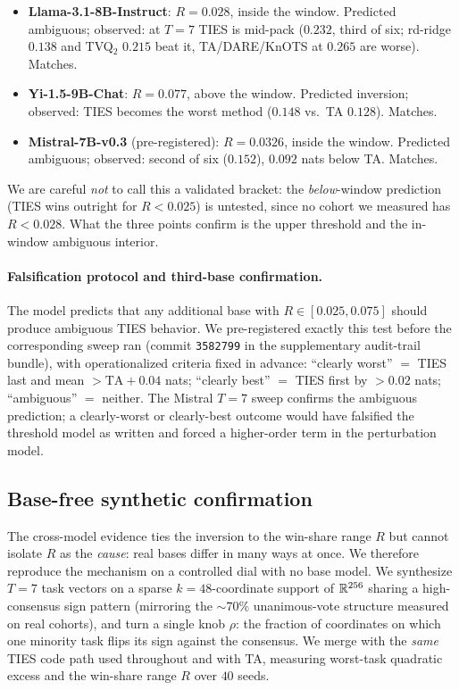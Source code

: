 \begin{itemize}[leftmargin=*,topsep=2pt,itemsep=2pt]
\item \textbf{Llama-3.1-8B-Instruct}: $R = 0.028$, inside the window.
Predicted ambiguous; observed: at $T = 7$ TIES is mid-pack ($0.232$,
third of six; rd-ridge $0.138$ and TVQ$_2$ $0.215$ beat it,
TA/DARE/KnOTS at $0.265$ are worse). Matches.
\item \textbf{Yi-1.5-9B-Chat}: $R = 0.077$, above the window.
Predicted inversion; observed: TIES becomes the worst method
($0.148$ vs.\ TA $0.128$). Matches.
\item \textbf{Mistral-7B-v0.3} (pre-registered): $R = 0.0326$, inside
the window. Predicted ambiguous; observed: second of six ($0.152$),
$0.092$ nats below TA. Matches.
\end{itemize}
We are careful \emph{not} to call this a validated bracket: the
\emph{below}-window prediction (TIES wins outright for $R < 0.025$) is
untested, since no cohort we measured has $R < 0.028$. What the three
points confirm is the upper threshold and the in-window ambiguous
interior.

\paragraph{Falsification protocol and third-base confirmation.} The
model predicts that any additional base with $R \in [0.025, 0.075]$
should produce ambiguous TIES behavior. We pre-registered exactly this
test before the corresponding sweep ran (commit \texttt{3582799} in
the supplementary audit-trail bundle), with operationalized criteria
fixed in advance: ``clearly worst'' $=$ TIES last and mean
$> \mathrm{TA} + 0.04$ nats; ``clearly best'' $=$ TIES first by
$> 0.02$ nats; ``ambiguous'' $=$ neither. The Mistral $T = 7$ sweep
confirms the ambiguous prediction; a clearly-worst or clearly-best
outcome would have falsified the threshold model as written and forced
a higher-order term in the perturbation model.

\subsection{Base-free synthetic confirmation}
\label{app:td2-synthetic}

The cross-model evidence ties the inversion to the win-share range $R$
but cannot isolate $R$ as the \emph{cause}: real bases differ in many
ways at once. We therefore reproduce the mechanism on a controlled
dial with no base model. We synthesize $T = 7$ task vectors on a
sparse $k = 48$-coordinate support of $\mathbb{R}^{256}$ sharing a
high-consensus sign pattern (mirroring the $\sim 70\%$ unanimous-vote
structure measured on real cohorts), and turn a single knob $\rho$:
the fraction of coordinates on which one minority task flips its sign
against the consensus. We merge with the \emph{same} TIES code path
used throughout and with TA, measuring worst-task quadratic excess and
the win-share range $R$ over $40$ seeds.

